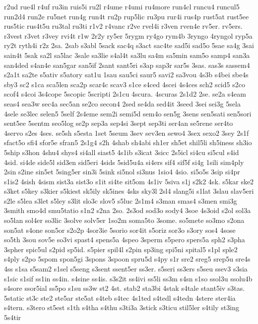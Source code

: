 {r2ud
rue4l
r4uf
ru3in
ruis5i
ru2l
r4ume
r4umi
ru4more
run4cl
runcu4
runcul5
run2d4
run2e
ru5net
run4g
run4t
ru2p
rup5lic
ru3pu
rur4i
rus4p
rust5at
rust5ee
rus5tic
rus4t5u
ru3tal
ru3ti
r1v2
r4vanc
r2ve
rvel4i
r3ven
rven4e
rv5er.
rv5ers.
r3vest
r3vet
r3vey
rvi4t
r1w
2r2y
ry5er
5rygm
ry4go
rym4b
3ryngo
4ryngol
ryp5a
ry2t
ryth4i
r2z
2sa.
2sab
s3abl
5sack
sac4q
s3act
sac4te
sad5i
sad5o
5sae
sa4g
3sai
sain4t
5sak
sa2l
sa5lac
3sale
sa3lie
s4al4t
sa3lu
sa4m
sa5min
sam5o
samp4
san3a
san4ded
s4an4e
san5gar
san5if
2sant
sant5ri
s3ap
sap3r
sar5s
3sas.
sas3s
sassem4
s2a1t
sa2te
s5ativ
s5atory
sat1u
1sau
sau5ci
saur5
savi2
sa3vou
4s3b
s4bei
sbe4s
sby3
sc2
s1ca
sca5len
sca2p
scar4c
scav3
s1ce
s4ced
4scei
4s4ces
sch2
scid5
s2co
scof4
s4coi
3s4cope
5scopic
5scripti
2s1cu
4scura.
4scuras
2s1d2
2se.
se2a
s4eam
seas4
sea3w
sec4a
sec5an
se2co
secon4
2sed
se4da
sed4it
3seed
3sei
sei3g
5sela
4sele
se3lec
selen5
5self
2s4eme
sem2i
semi5d
sem4o
sen5g
3sens
sen5sati
sen5sori
sent5ee
5sentm
seo5log
se2p
sep3a
sep4si
3sept
sep3ti
ser4an
se5rene
ser4to
4servo
s2es
4ses.
se5sh
s5esta
1set
5seum
3sev
sev3en
sewo4
3sex
sexo2
3sey
2s1f
sfact5o
sfi4
sfor5e
sfran5
2s1g4
s2h
4shab
sh4abi
sh1er
sh5et
shil5li
sh5iness
sh3io
5ship
s3hon
4shu4
shys4
si4all
siast5
4s1ib
s3icat
3sicc
2s5icl
si4cu
si5cul
s4id
4sid.
si4de
side5l
sid3en
sid5eri
4sids
5sid5u4a
si4ers
sif4
sif5f
si4g
1sili
sim4ply
2sin
s2ine
sin5et
5sing5er
sin3i
5sink
si5nol
si3nus
1sio4
4sio.
si5o5s
3sip
si4pr
s1is2
4sish
4sism
sist3a
sist3o
s1it
si4te
sit5om
4s1iv
5siva
s1j
s2k2
4sk.
s5kar
ske2
s3ket
s5key
s3kier
s5kiest
sk5ily
sk5ines
4sks
sky3l
2sl4
slang5i
s1lat
3slau
slav5eri
s2le
s5lea
s3let
s5ley
s3lit
slo3c
slov5
s5luc
2s1m4
s3man
smas4
s3men
smi3g
3smith
smo4d
smu5tatio
s1n2
s2na
2so.
2s3od
sod3o
sody4
3soe
4s3oid
s2ol
sol3a
so5lan
sol4er
so3lic
3solve
solv5er
1so2m
soma5to
3some.
so5mete
so3mo
s2ona
son5at
s4one
son5or
s2o2p
4sor3ie
5sorio
sor4it
s5oriz
sor3o
s3ory
sos4
4sose
so5th
3sou
sov5e
so3vi
spast4
spens5a
4speo
3sperm
s5pero
spers5a
sph2
s3pha
3spher
spic5ul
s2pid
sp5id.
s5pier
spil4l
s2pin
sp3ing
spi5ni
spital5
s1pl
sple2
s4ply
s2po
5spom
spon5gi
3spons
3spoon
spru5d
s4py
s1r
sre2
sreg5
srep5u
sre4s
4ss
s1sa
s5sam2
s1sel
s5seng
s3sent
ssent5er
ss3er.
s5seri
ss3ers
s5seu
ssev3
s3sia
s1sic
s1sif
ss1in
ss4in.
s4sine
ss4is.
s3s2it
ss4ivi
ss5li
ss3m
s4sn
s1so
ssol3u
ssolu4b
s4sore
ssor5ial
ss5po
s1su
ss3w
st2
4st.
stab2
sta3bi
4stak
s4tale
stant5iv
s3tas.
5static
st3c
ste2
ste5ar
ste5at
s4teb
s4tec
4s1ted
s4tedl
s4tedn
4stere
ster4ia
s4tern.
s3tero
st5est
s1th
s4tha
s4thu
s3ti3a
3stick
s3ticu
stil5ler
s4tily
st3ing
5s4tir
}
